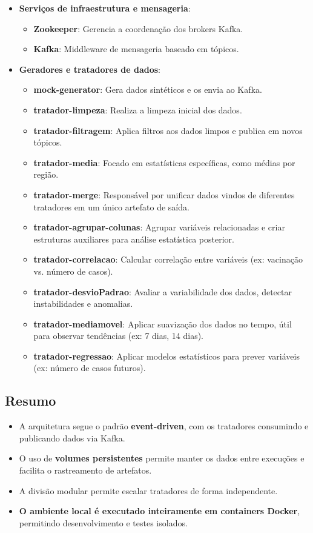 \documentclass[a4paper,12pt]{article}
\begin{document}
\begin{itemize}
  \item \textbf{Serviços de infraestrutura e mensageria}: 
          \begin{itemize}
          \item \textbf{Zookeeper}: Gerencia a coordenação dos brokers Kafka.
          \item \textbf{Kafka}: Middleware de mensageria baseado em tópicos.
          \end{itemize}
  \item \textbf{Geradores e tratadores de dados}:
  \begin{itemize}
  \item \textbf{mock-generator}: Gera dados sintéticos e os envia ao Kafka.
  \item \textbf{tratador-limpeza}: Realiza a limpeza inicial dos dados.
  \item \textbf{tratador-filtragem}: Aplica filtros aos dados limpos e publica em novos tópicos.
  \item \textbf{tratador-media}: Focado em estatísticas específicas, como médias por região.
  \item \textbf{tratador-merge}: Responsável por unificar dados vindos de diferentes tratadores em um único artefato de saída.
    \item \textbf{tratador-agrupar-colunas}: Agrupar variáveis relacionadas e criar estruturas auxiliares para análise estatística posterior.
    \item \textbf{tratador-correlacao}: Calcular correlação entre variáveis (ex: vacinação vs. número de casos).
    \item \textbf{tratador-desvioPadrao}: Avaliar a variabilidade dos dados, detectar instabilidades e anomalias.
    \item \textbf{tratador-mediamovel}: Aplicar suavização dos dados no tempo, útil para observar tendências (ex: 7 dias, 14 dias).
    \item \textbf{tratador-regressao}: Aplicar modelos estatísticos para prever variáveis (ex: número de casos futuros).
\end{itemize}
\end{itemize}

\subsection{Resumo}

\begin{itemize}
  \item A arquitetura segue o padrão \textbf{event-driven}, com os tratadores consumindo e publicando dados via Kafka.
  \item O uso de \textbf{volumes persistentes} permite manter os dados entre execuções e facilita o rastreamento de artefatos.
  \item A divisão modular permite escalar tratadores de forma independente.
  \item \textbf{O ambiente local é executado inteiramente em containers Docker}, permitindo desenvolvimento e testes isolados.
\end{itemize}
\end{document}
